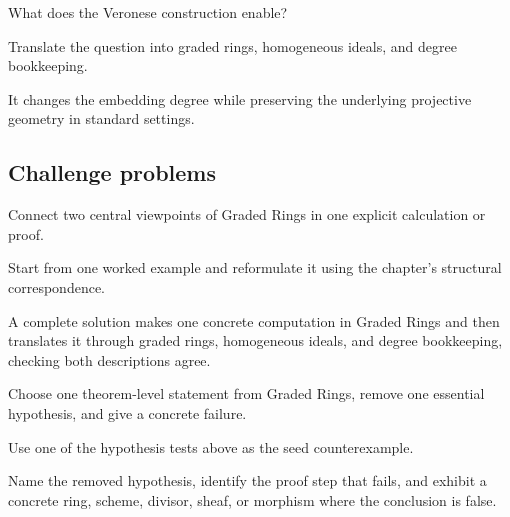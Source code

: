 \begin{exercise}\label{exr:vi34-expand-14}
What does the Veronese construction enable?
\end{exercise}
\begin{hint}
Translate the question into graded rings, homogeneous ideals, and degree bookkeeping.
\end{hint}
\begin{solution}
It changes the embedding degree while preserving the underlying projective geometry in standard settings.
\end{solution}

\subsection*{Challenge problems}

\begin{exercise}\label{exr:vi34-expand-15}
Connect two central viewpoints of Graded Rings in one explicit calculation or proof.
\end{exercise}
\begin{hint}
Start from one worked example and reformulate it using the chapter's structural correspondence.
\end{hint}
\begin{solution}
A complete solution makes one concrete computation in Graded Rings and then translates it through graded rings, homogeneous ideals, and degree bookkeeping, checking both descriptions agree.
\end{solution}

\begin{exercise}\label{exr:vi34-expand-16}
Choose one theorem-level statement from Graded Rings, remove one essential hypothesis, and give a concrete failure.
\end{exercise}
\begin{hint}
Use one of the hypothesis tests above as the seed counterexample.
\end{hint}
\begin{solution}
Name the removed hypothesis, identify the proof step that fails, and exhibit a concrete ring, scheme, divisor, sheaf, or morphism where the conclusion is false.
\end{solution}

